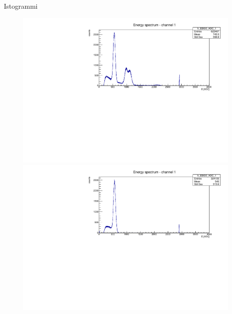 \documentclass [xcolor=svgnames] {beamer}
\begin{document}

\begin{frame}{Istogrammi}
	\begin{figure}
		\centering
		\begin{minipage}{0.45\textwidth}
			\centering
			\includegraphics[width=\linewidth]{img/ex1775.pdf} %
		\end{minipage}
		\hfill
		\begin{minipage}{0.45\textwidth}
			\centering
			\includegraphics[width=\linewidth]{img/ex1776.pdf} %
		\end{minipage}
		

\end{figure}
\end{frame}
\end{document}
